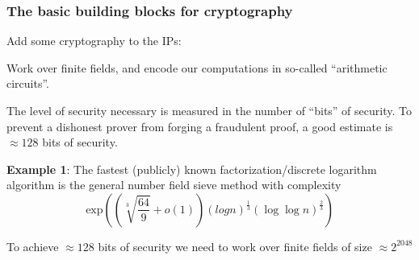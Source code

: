 \documentclass[options]{beamer}
\begin{document}
\begin{frame}
    \frametitle{The basic building blocks for cryptography}

    Add some cryptography to the IPs:

    Work over finite fields, and encode our computations in so-called ``arithmetic circuits''.

    The level of security necessary is measured in the number of ``bits'' of security. To prevent a dishonest prover from forging a fraudulent proof, a good estimate is $\approx 128$ bits of security.

    {\bf Example 1}: The fastest (publicly) known factorization/discrete logarithm algorithm is the general number field sieve method with complexity
    $$\mathrm{exp}\left(\left(\sqrt[3]{\frac{64}{9}} + o(1)\right)(log n)^{\frac{1}{3}} (\log \log n)^{\frac{2}{3}}\right)$$

    To achieve $\approx 128$ bits of security we need to work over finite fields of size $\approx 2^{2048}$
\end{frame}
\end{document}
